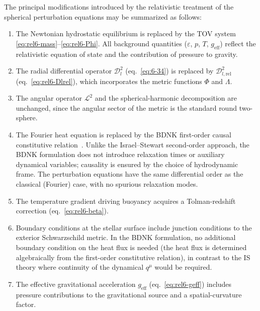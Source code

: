 The principal modifications introduced by the relativistic treatment
of the spherical perturbation equations may be summarized as follows:
\begin{enumerate}
\item The Newtonian hydrostatic equilibrium is replaced by the TOV
  system \eqref{eq:rel6-mass}--\eqref{eq:rel6-Phi}.  All background
  quantities ($\varepsilon$, $p$, $T$, $g_{\mathrm{eff}}$) reflect the
  relativistic equation of state and the contribution of pressure to
  gravity.

\item The radial differential operator $\mathscr{D}_{l}^{2}$
  (eq.~\eqref{eq:6-34}) is replaced by
  $\mathscr{D}_{l,\mathrm{rel}}^{2}$ (eq.~\eqref{eq:rel6-Dlrel}),
  which incorporates the metric functions $\Phi$ and $\Lambda$.

\item The angular operator $\mathscr{L}^{2}$ and the spherical-harmonic
  decomposition are unchanged, since the angular sector of the metric
  is the standard round two-sphere.

\item The Fourier heat equation is replaced by the BDNK first-order
  causal constitutive relation~\cite{BemficaDN2018,Kovtun2019}.
  Unlike the Israel--Stewart second-order approach, the BDNK formulation
  does not introduce relaxation times or auxiliary dynamical variables;
  causality is ensured by the choice of hydrodynamic frame.  The
  perturbation equations have the same differential order as the
  classical (Fourier) case, with no spurious relaxation modes.

\item The temperature gradient driving buoyancy acquires a
  Tolman-redshift correction (eq.~\eqref{eq:rel6-beta}).

\item Boundary conditions at the stellar surface include junction
  conditions to the exterior Schwarzschild metric.  In the BDNK
  formulation, no additional boundary condition on the heat flux is
  needed (the heat flux is determined algebraically from the
  first-order constitutive relation), in contrast to the IS theory
  where continuity of the dynamical $q^{\mu}$ would be required.

\item The effective gravitational acceleration
  $g_{\mathrm{eff}}$ (eq.~\eqref{eq:rel6-geff}) includes pressure
  contributions to the gravitational source and a spatial-curvature
  factor.
\end{enumerate}

